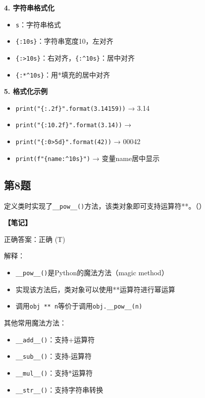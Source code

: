 \begin{mdframed}[linewidth=1pt, linecolor=black]
    \textbf{4. 字符串格式化}
    \begin{itemize}
      \item \texttt{s}：字符串格式
      \item \verb|{:10s}|：字符串宽度10，左对齐
      \item \verb|{:>10s}|：右对齐，\verb|{:^10s}|：居中对齐
      \item \verb|{:*^10s}|：用*填充的居中对齐
    \end{itemize}

    \textbf{5. 格式化示例}
    \begin{itemize}
      \item \verb|print("{:.2f}".format(3.14159))| → 3.14
      \item \verb|print("{:10.2f}".format(3.14))| → \quad\quad{}
      \item \verb|print("{:0>5d}".format(42))| → 00042
      \item \verb|print(f"{name:^10s}")| → 变量name居中显示
    \end{itemize}

  \end{mdframed}

  \subsection{第8题}
  定义类时实现了\texttt{\_\_pow\_\_()}方法，该类对象即可支持运算符**。（\quad）

  \begin{mdframed}[linewidth=1pt, linecolor=black]
    \textbf{\color{red}【笔记】}

    正确答案：正确 (T)

    解释：
    \begin{itemize}
      \item \texttt{\_\_pow\_\_()}是Python的魔法方法（magic method）
      \item 实现该方法后，类对象可以使用**运算符进行幂运算
      \item 调用\texttt{obj ** n}等价于调用\texttt{obj.\_\_pow\_\_(n)}
    \end{itemize}

    其他常用魔法方法：
    \begin{itemize}
      \item \texttt{\_\_add\_\_()}：支持+运算符
      \item \texttt{\_\_sub\_\_()}：支持-运算符
      \item \texttt{\_\_mul\_\_()}：支持*运算符
      \item \texttt{\_\_str\_\_()}：支持字符串转换
    \end{itemize}

  \end{mdframed}

